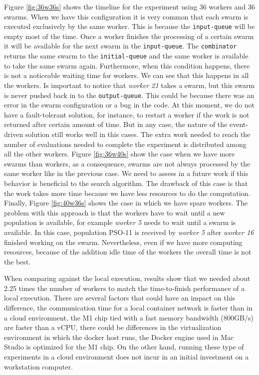 \documentclass{cys}
\begin{document}
Figure \ref{fig:36w36s} shows the timeline for the experiment using 36 workers and 36 swarms.
When we have this configuration it is very common that each swarm is executed exclusively by 
the same worker. This is because the \texttt{input-queue} will be empty most of the time. Once
a worker finishes the processing of a certain swarm it will be available for
the next swarm in the \texttt{input-queue}. The \texttt{combinator} returns the 
same swarm to the \texttt{initial-queue} and the same worker is available to take
the same swarm again. Furthermore, when this condition happens, there
is not a noticeable waiting time for workers. We can see that this happens in all
the workers. Is important to notice that \emph{worker 21} takes a swarm, but this swarm is 
never pushed back in to the \texttt{output-queue}. This could be because there was 
an error in the swarm configuration or a bug in the code. At this moment, 
we do not have a fault-tolerant solution, for instance, to restart a worker if the work 
is not returned after certain amount of time. But in any case, the nature 
of the event-driven solution still works well in this cases. The extra work needed to 
reach the number of evaluations needed to complete the experiment is 
distributed among all the other workers. Figure \ref{fig:36w40s} show the case 
when we have more swarms than workers, as a consequence, swarms are not always 
processed by the same worker like in the previous case. We need to assess in a 
future work if this behavior is beneficial to the search algorithm. 
The drawback of this case is that the work takes more time because we have 
less resources to do the computation. Finally, Figure \ref{fig:40w36s} shows the 
case in which we have spare workers. The problem with this approach is that 
the workers have to wait until a new population is available, for example 
\emph{worker 5} needs to wait until a
swarm is available. In this case, population PSO-11 is received by \emph{worker 5} 
after \emph{worker 16} finished working on the swarm. Nevertheless, even if we have more computing resources, 
because of the addition idle time of the workers the overall time is not the best. 

When comparing against the local execution, results show that we needed about 2.25 
times the number of workers to match the time-to-finish performance of a local execution.
There are several factors that could have an impact on this difference, the communication time
for a local container network is faster than in a cloud environment, the M1 chip tied with 
a fast memory bandwidth (800GB/s) are faster than a vCPU, there could be differences 
in the virtualization environment in which the docker host runs, the Docker engine used 
in Mac Studio is optimized for the M1 chip. On the other hand, running these type of 
experiments in a cloud environment does not incur in an initial investment on a workstation 
computer. 
\end{document}
